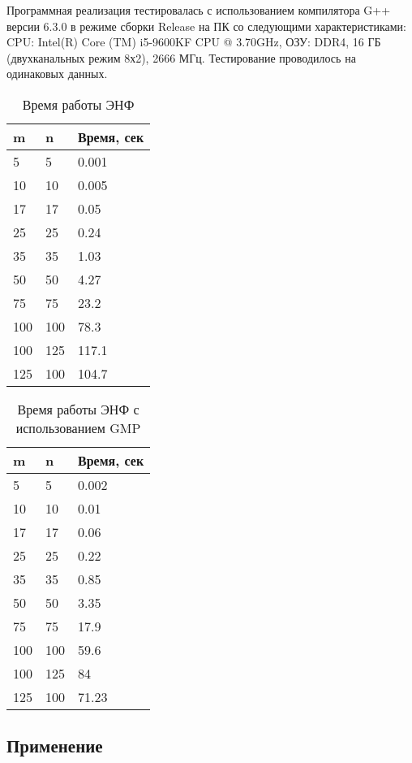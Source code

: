 Программная реализация тестировалась с использованием компилятора G++ версии 6.3.0 в режиме сборки Release на ПК со следующими характеристиками: CPU: Intel(R) Core (TM) i5-9600KF CPU @ 3.70GHz, ОЗУ: DDR4, 16 ГБ (двухканальных режим 8х2), 2666 МГц. Тестирование проводилось на одинаковых данных.

\begin{table}[H]
  \caption{Время работы ЭНФ}
  \centering
  \begin{tabular}{ | l | l | l |}
  \hline
  m & n & Время, сек   \\ \hline
  5 & 5 & 0.001 \\ \hline
  10 & 10 & 0.005 \\ \hline
  17 & 17 & 0.05 \\ \hline
  25 & 25 & 0.24 \\ \hline
  35 & 35 & 1.03 \\ \hline
  50 & 50 & 4.27 \\ \hline
  75 & 75 & 23.2 \\ \hline
  100 & 100 & 78.3 \\ \hline
  100 & 125 & 117.1 \\ \hline
  125 & 100 & 104.7 \\ \hline
  \end{tabular}
  \label{table:HNF}
\end{table}

\begin{table}[H]
  \caption{Время работы ЭНФ с использованием GMP}
  \centering
  \begin{tabular}{ | l | l | l |}
  \hline
  m & n & Время, сек   \\ \hline
  5 & 5 & 0.002 \\ \hline
  10 & 10 & 0.01 \\ \hline
  17 & 17 & 0.06 \\ \hline
  25 & 25 & 0.22 \\ \hline
  35 & 35 & 0.85 \\ \hline
  50 & 50 & 3.35 \\ \hline
  75 & 75 & 17.9 \\ \hline
  100 & 100 & 59.6 \\ \hline
  100 & 125 & 84 \\ \hline
  125 & 100 & 71.23 \\ \hline
  \end{tabular}
  \label{table:HNF_GMP}
\end{table}

\subsection{Применение}

